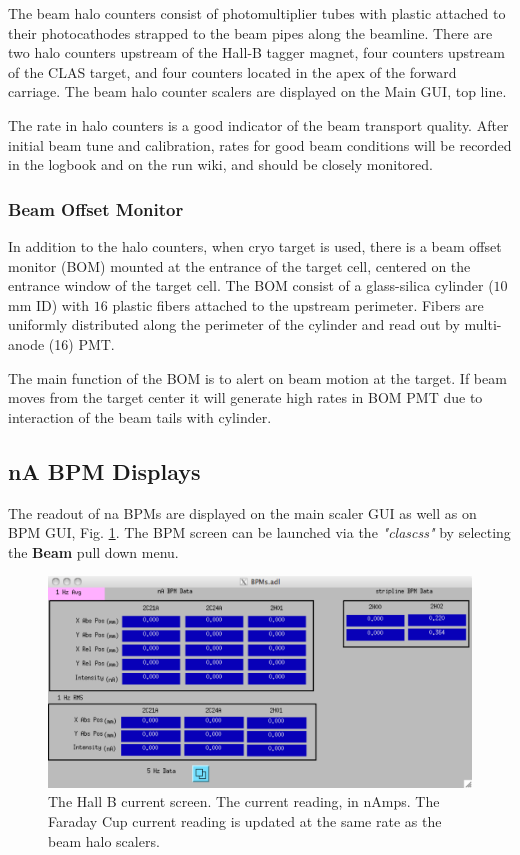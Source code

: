 \documentclass[12pt]{article}
\begin{document}
The beam halo counters consist of photomultiplier tubes with plastic attached to their photocathodes strapped to the beam pipes along the beamline. There are two halo counters 
upstream of the Hall-B tagger magnet, four counters upstream of the CLAS target, and four counters located in the apex of the forward carriage. The beam halo counter scalers are displayed on the Main GUI, top line. 

The rate in halo counters is a good indicator of the beam transport quality. After initial beam tune and calibration, rates for good beam conditions will be recorded in the logbook and on the run wiki, and should be closely monitored. 

\subsubsection{Beam Offset Monitor}
\indent

In addition to the halo counters, when cryo target is used, there is a beam offset monitor (BOM) mounted at the entrance of the target cell, centered on the entrance window of the target cell. The BOM consist of a glass-silica cylinder ($10$ mm ID) with $16$ plastic fibers attached to the upstream perimeter. Fibers are uniformly distributed along the perimeter of the cylinder and read out by multi-anode (16) PMT. 

The main function of the BOM is to alert on beam motion at the target. If beam moves from the target center it will generate high rates in BOM PMT due to interaction of the beam tails with cylinder. 


\subsection{nA BPM Displays}
\indent

The readout of na BPMs are displayed on the main scaler GUI as well as on BPM GUI, Fig. \ref{fig:bpm}. The BPM screen can be launched
via the \emph{"clascss"} by selecting the \textbf{Beam}
pull down menu.
\begin{figure}[tbhp]
{\centering \includegraphics[scale=0.5]{bpms.pdf} \par}
\caption{The Hall B current screen. The current reading, in nAmps. The Faraday Cup current
reading is updated at the same rate as the beam halo scalers. \label{fig:bpm}}
\end{figure}
\end{document}
